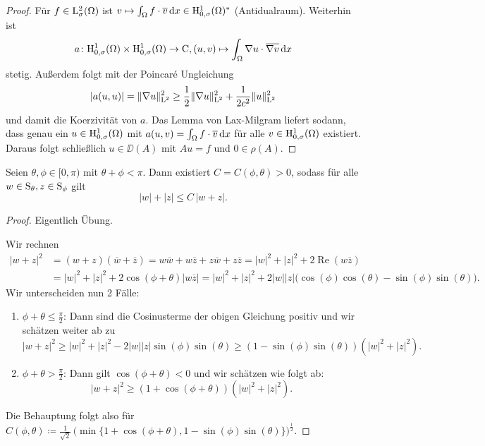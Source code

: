 \begin{proof}
  Für $f \in \mathrm{L}_\sigma^2(\Omega)$ ist $v \mapsto \int_\Omega f \cdot \overline v \, {\operatorname{d}\!{x}} \in \mathrm{H}_{0,\sigma}^1(\Omega)^*$ (Antidualraum).
  Weiterhin ist $$a \colon \mathrm{H}_{0,\sigma}^1(\Omega) \times \mathrm{H}_{0,\sigma}^1(\Omega) \to \mathrm{C}, (u,v) \mapsto \int_\Omega \nabla u \cdot \overline{\nabla v} \, {\operatorname{d}\!{x}}$$ stetig.
  Außerdem folgt mit der Poincar\'e Ungleichung
  $$
  |a(u,u)| = \|\nabla u\|_{\mathrm{L}^2}^2 \geq \frac{1}{2} \|\nabla u\|_{\mathrm{L}^2}^2 + \frac{1}{2 c^2} \|u\|_{\mathrm{L}^2}^2
  $$
  und damit die Koerzivität von $a$.
  Das Lemma von Lax-Milgram liefert sodann, dass genau ein $u \in \mathrm{H}_{0,\sigma}^1(\Omega)$ mit $a(u,v) = \int_\Omega f \cdot \overline v \, {\operatorname{d}\!{x}}$ für alle $v \in \mathrm{H}_{0,\sigma}^1(\Omega)$ existiert.
  Daraus folgt schließlich $u \in \DD(A)$ mit $A u = f$ und $0 \in \rho(A)$.
\end{proof}

\begin{lem}
  \label{lem:inverseTriangle}
  Seien $\theta, \phi \in [0,\pi)$ mit $\theta + \phi < \pi$.
    Dann existiert $C = C(\phi,\theta) > 0$, sodass für alle $w \in \mathrm{S}_\theta, z \in \mathrm{S}_\phi$ gilt
    $$
    |w| + |z| \leq C \,|w + z|.
    $$
\end{lem}

\begin{proof}
  Eigentlich Übung.

  Wir rechnen
  \begin{align*}
    |w + z|^2 
    &= (w + z)(\overline w + \overline z)  
    = w \overline w + w \overline z + z \overline w + z \overline z 
    = |w|^2 + |z|^2 + 2 \operatorname{Re}(w \overline z) \\
    &= |w|^2 + |z|^2 + 2 \cos (\phi + \theta) |w \overline z|
    = |w|^2 + |z|^2 + 2|w||z| \big(\cos(\phi)\cos(\theta) - \sin(\phi)\sin(\theta)\big).
  \end{align*}
  Wir unterscheiden nun 2 Fälle:
  \begin{enumerate}[1.]
    \item $\phi +  \theta \leq \frac{\pi}{2}$: Dann sind die Cosinusterme der obigen Gleichung positiv und wir schätzen weiter ab zu
      $$
      |w + z|^2 \geq |w|^2 + |z|^2 - 2|w||z|\sin(\phi)\sin(\theta) \geq (1 - \sin(\phi)\sin(\theta)) (|w|^2 + |z|^2).
      $$
    \item $\phi + \theta > \frac{\pi}{2}$: Dann gilt $\cos(\phi + \theta) < 0$ und wir schätzen wie folgt ab:
      $$
      |w + z|^2 \geq (1 + \cos(\phi + \theta)) (|w|^2 + |z|^2 ).
      $$
  \end{enumerate}
  Die Behauptung folgt also für $C(\phi,\theta) \coloneqq \frac{1}{\sqrt{2}}\, \Big(\min\{1 + \cos(\phi + \theta), 1 - \sin(\phi)\sin(\theta)\}\Big)^{\frac{1}{2}}$.
\end{proof}

